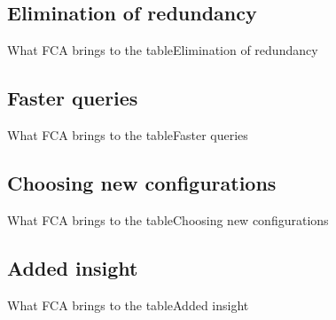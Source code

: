 \subsection{Elimination of redundancy}
\begin{frame}{What FCA brings to the table}{Elimination of redundancy}
\end{frame}

\subsection{Faster queries}
\begin{frame}{What FCA brings to the table}{Faster queries}
\end{frame}

\subsection{Choosing new configurations}
\begin{frame}{What FCA brings to the table}{Choosing new configurations}
\end{frame}

\subsection{Added insight}
\begin{frame}{What FCA brings to the table}{Added insight}
\end{frame}